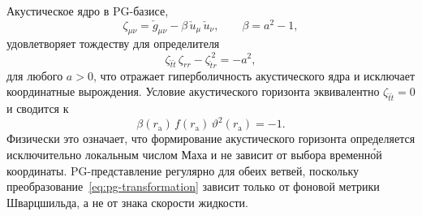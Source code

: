 \documentclass[12pt,a4paper,preprint]{elsarticle}
\begin{document}
            Акустическое ядро в PG-базисе,
            \begin{equation}
                \zeta_{\mu\nu} = \check{g}_{\mu\nu} - \beta\,\check{u}_{\mu}\,\check{u}_{\nu}, \qquad \beta = a^{2} - 1,
                \label{eq:acoustic-core-pg}
            \end{equation}
            удовлетворяет тождеству для определителя
            \begin{equation}
                \zeta_{\check{t}\check{t}}\,\zeta_{rr} - \zeta_{\check{t}r}^{\,2} = -a^{2},
                \label{eq:determinant-identity}
            \end{equation}
            для любого $a > 0$, что отражает гиперболичность акустического ядра и исключает координатные вырождения. Условие акустического горизонта эквивалентно $\zeta_{\check{t}\check{t}} = 0$ и сводится к~\cite{SemyannikovAV_GlobalAcousticGeometryOfMichelFlowInPainleveGullstrandCoordinates_2026}
            \begin{equation}
                \beta(r_{\mathrm{a}})\,f(r_{\mathrm{a}})\,\vartheta^{2}(r_{\mathrm{a}}) = -1.
                \label{eq:horizon-condition-pg}
            \end{equation}
            Физически это означает, что формирование акустического горизонта определяется исключительно локальным числом Маха и не зависит от выбора временн\'{о}й координаты. PG-представление регулярно для обеих ветвей, поскольку преобразование~\eqref{eq:pg-transformation} зависит только от фоновой метрики Шварцшильда, а не от знака скорости жидкости.
\end{document}
